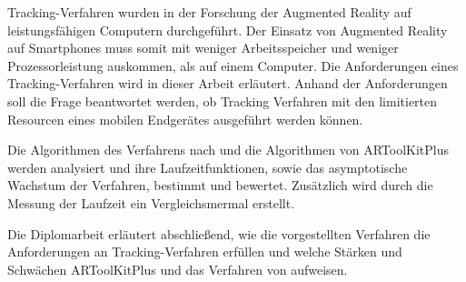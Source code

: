 Tracking-Verfahren wurden in der Forschung der Augmented Reality auf leistungsfähigen Computern durchgeführt. Der
 Einsatz von Augmented Reality auf Smartphones muss somit mit weniger Arbeitsspeicher und weniger Prozessorleistung
 auskommen, als auf einem Computer. Die Anforderungen eines Tracking-Verfahren wird in dieser Arbeit erläutert. Anhand
 der Anforderungen soll die Frage beantwortet werden, ob Tracking Verfahren mit den limitierten Resourcen eines
 mobilen Endgerätes ausgeführt werden können.

Die Algorithmen des Verfahrens nach \citeauthor{hirzer08} und die Algorithmen von ARToolKitPlus werden analysiert und
 ihre Laufzeitfunktionen, sowie das asymptotische Wachstum der Verfahren, bestimmt und bewertet. Zusätzlich wird durch
 die Messung der Laufzeit ein Vergleichsmermal erstellt.

Die Diplomarbeit erläutert abschließend, wie die vorgestellten Verfahren die Anforderungen an Tracking-Verfahren
 erfüllen und welche Stärken und Schwächen ARToolKitPlus und das Verfahren von \citeauthor{hirzer08} aufweisen.

\tableofcontents

\mainmatter


\nocite{*}

%
\appendix

\backmatter

\printbibliography[]



